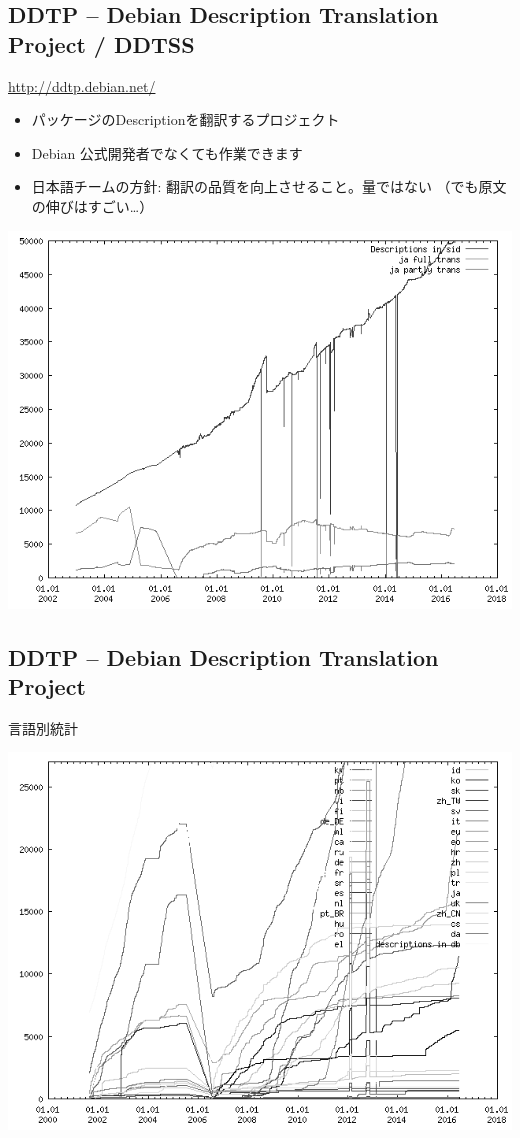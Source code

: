 \documentclass[mingoth,a4paper]{jsarticle}
\begin{document}
\subsection{DDTP -- Debian Description Translation Project / DDTSS }

 \url{http://ddtp.debian.net/}

  \begin{itemize}
   \item パッケージのDescriptionを翻訳するプロジェクト
   \item Debian 公式開発者でなくても作業できます
   \item 日本語チームの方針: 翻訳の品質を向上させること。量ではない
     {\scriptsize （でも原文の伸びはすごい…）}
  \end{itemize}

  \begin{center}
  \includegraphics[width=0.65\hsize]{image201606/stat-trans-sid-ja_mono.png}
  \end{center}

\subsection{DDTP -- Debian Description Translation Project}
   言語別統計

   \begin{center}
  \includegraphics[width=0.65\hsize]{image201606/ddts-stat_mono.png}
   \end{center}
\end{document}
